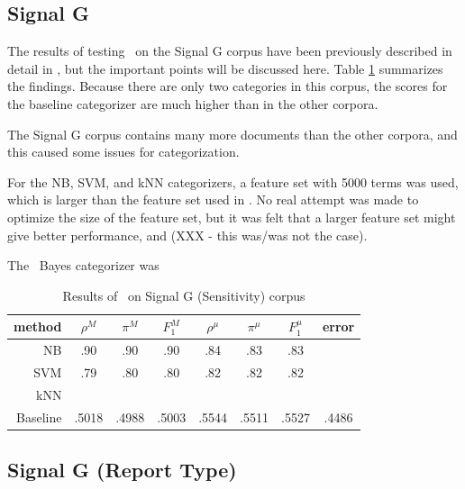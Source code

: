 \subsection{Signal G}

The results of testing \aicat\ on the Signal G corpus
have been previously described in detail in \cite{calvo:02}, but the
important points will be discussed here.  Table
\ref{signalg-sens-results} summarizes the findings.  Because there are
only two categories in this corpus, the scores for the baseline
categorizer are much higher than in the other corpora.

The Signal G corpus contains many more documents than the other
corpora, and this caused some issues for categorization.

For the NB, SVM, and kNN categorizers, a feature set with 5000 terms
was used, which is larger than the feature set used in
\cite{calvo:02}.  No real attempt was made to optimize the size of the
feature set, but it was felt that a larger feature set might give
better performance, and (XXX - this was/was not the case).

The \naive\ Bayes categorizer was


\begin{table}
\begin{center}
\begin{tabular}{|r c c c c c c c|}
\hline
method    & $\rho^M$ & $\pi^M$ & $F_1^M$ & $\rho^\mu$ & $\pi^\mu$ & $F_1^\mu$ &   error \\
\hline
NB        &   .90    &  .90    &  .90    &  .84       &  .83      &  .83      &         \\
SVM       &   .79    &  .80    &  .80    &  .82       &  .82      &  .82      &         \\
kNN       \\
Baseline  &   .5018  &  .4988  &  .5003  &  .5544     &  .5511    &  .5527    &  .4486  \\
\hline
\end{tabular}
\end{center}
\caption{Results of \aicat\ on Signal G (Sensitivity) corpus}
\label{signalg-sens-results}
\end{table}


\subsection{Signal G (Report Type)}

